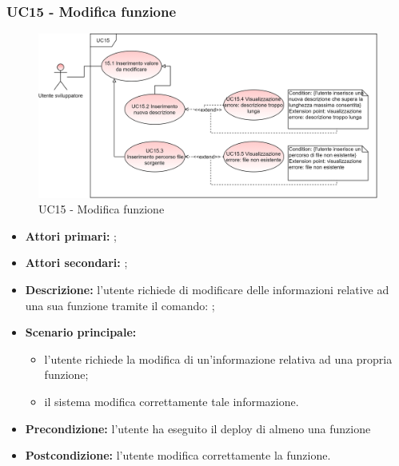\subsubsection{UC15 - Modifica funzione }
\begin{figure}[h]
	\centering
	\includegraphics[scale=\ucs]{./res/img/UC15.png}
	\caption {UC15 - Modifica funzione }
\end{figure}
\begin{itemize}
	\item \textbf{Attori primari:} \us{};
	\item \textbf{Attori secondari:} \re{};
	\item \textbf{Descrizione:} l’utente richiede di modificare delle informazioni relative ad una sua funzione tramite il comando: \pedit{};
	\item \textbf{Scenario principale:} 
	\begin{itemize}
		\item  l’utente richiede la modifica di un’informazione relativa ad una propria funzione;
		\item il sistema modifica correttamente tale informazione.  
	\end{itemize}
	\item \textbf{Precondizione:} l’utente ha eseguito il deploy di almeno una funzione
	\item \textbf{Postcondizione:} l’utente modifica correttamente la funzione. 
\end{itemize}